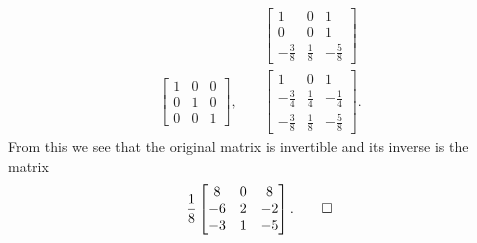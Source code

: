 \begin{solution}
\begin{align*}
    &\quad
    \begin{bmatrix}
      1 & 0 & 1 \\[3pt]
      0 & 0 & 1 \\[3pt]
      -\frac38 & \frac18 & -\frac58
    \end{bmatrix} \\
    \begin{bmatrix}
      1 & 0 & 0 \\[3pt]
      0 & 1 & 0 \\[3pt]
      0 & 0 & 1
    \end{bmatrix},
    &\quad
    \begin{bmatrix}
      1 & 0 & 1 \\[3pt]
      -\frac34 & \frac14 & -\frac14 \\[3pt]
      -\frac38 & \frac18 & -\frac58
    \end{bmatrix}.
  \end{align*}
  From this we see that the original matrix is invertible and its
  inverse is the matrix
  \begin{equation*}
    \frac18
    \begin{bmatrix}
      8 & 0 & 8 \\
      -6 & 2 & -2 \\
      -3 & 1 & -5
    \end{bmatrix}. \qedhere
  \end{equation*}
\end{solution}

